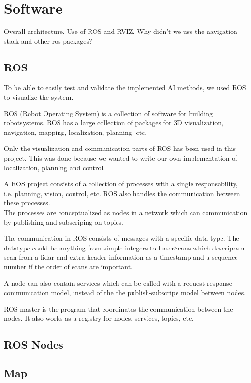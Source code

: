 
\section{Software} 
\label{sec:software}

Overall architecture.
Use of ROS and RVIZ.
Why didn't we use the navigation stack and other ros packages?

\subsection{ROS}
To be able to easily test and validate the implemented AI methods, we used ROS to visualize the system.

ROS (Robot Operating System) is a collection of software for building robotsystems.
ROS has a large collection of packages for 3D visualization, navigation, mapping, localization, planning, etc.  

Only the visualization and communication parts of ROS has been used in this project.
This was done because we wanted to write our own implementation of localization, planning and control.

A ROS project consists of a collection of processes with a single responsability, i.e. planning, vision, control, etc. 
ROS also handles the communication between these processes.\\
The processes are conceptualized as nodes in a network which can communication by publishing and subscriping on topics.

The communication in ROS consists of messages with a specific data type.
The datatype could be anything from simple integers to LaserScans which descripes a scan from a lidar and extra header information as a timestamp and a sequence number if the order of scans are important.

A node can also contain services which can be called with a request-response communication model, instead of the the publish-subscripe model between nodes.

ROS master is the program that coordinates the communication between the nodes.
It also works as a registry for nodes, services, topics, etc.

\subsection{ROS Nodes}
\subsection{Map}
